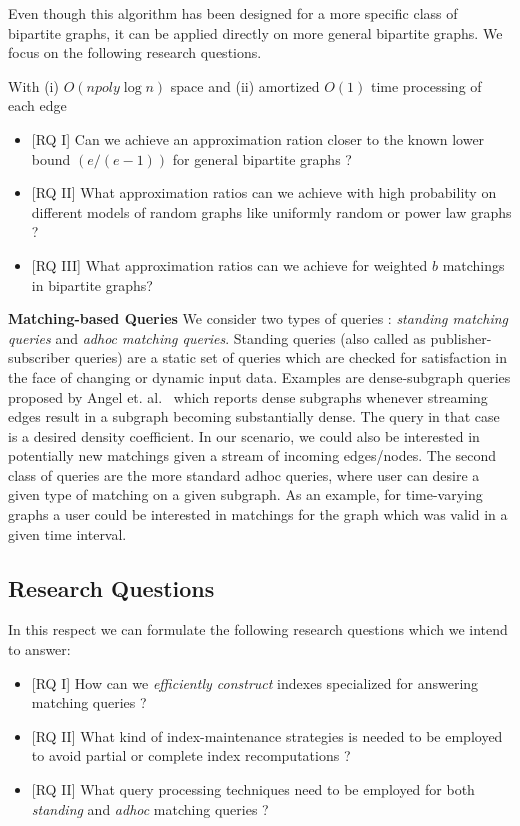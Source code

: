 Even though this algorithm has been designed for a more specific class of bipartite graphs, it can be applied directly on more general bipartite graphs. We focus on the following research questions.

With (i) $O(n poly \log n)$ space and  (ii) amortized $O(1)$ time processing of each edge
\begin{itemize}
\item  \textsf{[RQ I]} Can we achieve an approximation ration closer to the known lower bound $(e/(e-1))$ for general bipartite graphs ?
\item \textsf{[RQ II]} What approximation ratios can we achieve with high probability on different models of random graphs like uniformly random or power law graphs ?
\item \textsf{[RQ III]} What approximation ratios can we achieve for weighted $b$ matchings in bipartite graphs?

\end{itemize}



\label{wp:indexing}

\textbf{Matching-based Queries} 
We consider two types of queries : \emph{standing matching queries} and \emph{adhoc matching queries}. Standing queries (also called as publisher-subscriber queries) are a static set of queries which are checked for satisfaction in the face of changing or dynamic input data. Examples are dense-subgraph queries proposed by Angel et. al.~\cite{angel_dense_2013} which reports dense subgraphs whenever streaming edges result in a subgraph becoming substantially dense. The query in that case is a desired density coefficient. In our scenario, we could also be interested in potentially new matchings given a stream of incoming edges/nodes. The second class of queries are the more standard adhoc queries, where user can desire a given type of matching on a given subgraph. As an example, for time-varying graphs a user could be interested in matchings for the graph which was valid in a given time interval.


\subsection{Research Questions}     
In this respect we can formulate the following research questions which we intend to answer:
\begin{itemize}
    \item \textsf{[RQ I]} How can we \emph{efficiently construct} indexes specialized for answering matching queries ? 

    \item \textsf{[RQ II]} What kind of index-maintenance strategies is needed to be employed to avoid partial or complete index recomputations ?

    \item \textsf{[RQ II]} What query processing techniques need to be employed for both \emph{standing} and \emph{adhoc} matching queries ?

\end{itemize}




